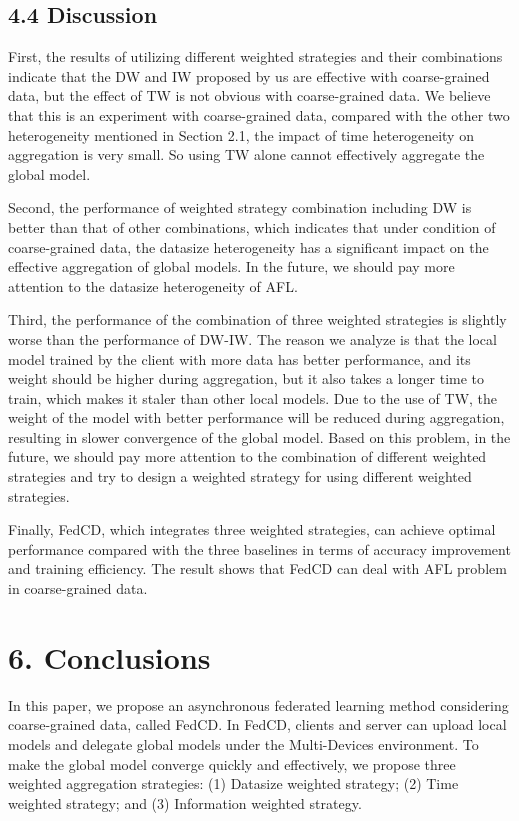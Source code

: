 \documentclass[twoside,twocolumn]{article}
\begin{document}
\subsection{4.4 Discussion}

	First, the results of utilizing different weighted strategies and their combinations indicate that the DW and IW proposed by us are effective with coarse-grained data, but the effect of TW is not obvious with coarse-grained data. We believe that this is an experiment with coarse-grained data, compared with the other two heterogeneity mentioned in Section 2.1, the impact of time heterogeneity on aggregation is very small. So using TW alone cannot effectively aggregate the global model.
	
	Second, the performance of weighted strategy combination including DW is better than that of other combinations, which indicates that under condition of coarse-grained data, the datasize heterogeneity has a significant impact on the effective aggregation of global models. In the future, we should pay more attention to the datasize heterogeneity of AFL.
	
	Third, the performance of the combination of three weighted strategies is slightly worse than the performance of DW-IW. The reason we analyze is that the local model trained by the client with more data has better performance, and its weight should be higher during aggregation, but it also takes a longer time to train, which makes it staler than other local models. Due to the use of TW, the weight of the model with better performance will be reduced during aggregation, resulting in slower convergence of the global model. Based on this problem, in the future, we should pay more attention to the combination of different weighted strategies and try to design a weighted strategy for using different weighted strategies.
	
	Finally, FedCD, which integrates three weighted strategies, can achieve optimal performance compared with the three baselines in terms of accuracy improvement and training efficiency. The result shows that FedCD can deal with AFL problem in coarse-grained data.
%
\section{6. Conclusions}

	In this paper, we propose an asynchronous federated learning method considering coarse-grained data, called FedCD. In FedCD, clients and server can upload local models and delegate global models under the Multi-Devices environment. To make the global model converge quickly and effectively, we propose three weighted aggregation strategies: (1) Datasize weighted strategy; (2) Time weighted strategy; and (3) Information weighted strategy.
	
\end{document}
